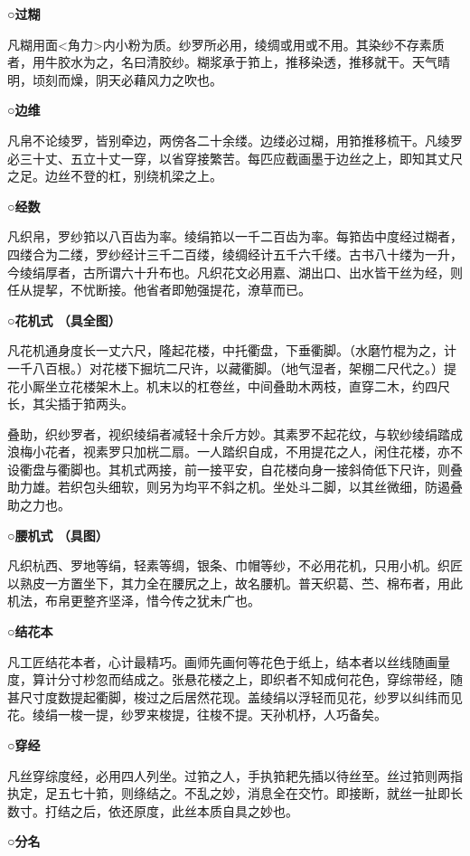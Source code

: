 \documentclass[]{article}
\begin{document}
\textbf{○过糊}

凡糊用面\textless{}角力\textgreater{}内小粉为质。纱罗所必用，绫绸或用或不用。其染纱不存素质者，用牛胶水为之，名曰清胶纱。糊浆承于筘上，推移染透，推移就干。天气晴明，顷刻而燥，阴天必藉风力之吹也。

\textbf{○边维}

凡帛不论绫罗，皆别牵边，两傍各二十余缕。边缕必过糊，用筘推移梳干。凡绫罗必三十丈、五立十丈一穿，以省穿接繁苦。每匹应截画墨于边丝之上，即知其丈尺之足。边丝不登的杠，别绕机梁之上。

\textbf{○经数}

凡织帛，罗纱筘以八百齿为率。绫绢筘以一千二百齿为率。每筘齿中度经过糊者，四缕合为二缕，罗纱经计三千二百缕，绫绸经计五千六千缕。古书八十缕为一升，今绫绢厚者，古所谓六十升布也。凡织花文必用嘉、湖出口、出水皆干丝为经，则任从提挈，不忧断接。他省者即勉强提花，潦草而已。

\textbf{○花机式 （具全图）}

凡花机通身度长一丈六尺，隆起花楼，中托衢盘，下垂衢脚。（水磨竹棍为之，计一千八百根。）对花楼下掘坑二尺许，以藏衢脚。（地气湿者，架棚二尺代之。）提花小厮坐立花楼架木上。机末以的杠卷丝，中间叠助木两枝，直穿二木，约四尺长，其尖插于筘两头。

叠助，织纱罗者，视织绫绢者减轻十余斤方妙。其素罗不起花纹，与软纱绫绢踏成浪梅小花者，视素罗只加桄二扇。一人踏织自成，不用提花之人，闲住花楼，亦不设衢盘与衢脚也。其机式两接，前一接平安，自花楼向身一接斜倚低下尺许，则叠助力雄。若织包头细软，则另为均平不斜之机。坐处斗二脚，以其丝微细，防遏叠助之力也。

\textbf{○腰机式 （具图）}

凡织杭西、罗地等绢，轻素等绸，银条、巾帽等纱，不必用花机，只用小机。织匠以熟皮一方置坐下，其力全在腰尻之上，故名腰机。普天织葛、苎、棉布者，用此机法，布帛更整齐坚泽，惜今传之犹未广也。

\textbf{○结花本}

凡工匠结花本者，心计最精巧。画师先画何等花色于纸上，结本者以丝线随画量度，算计分寸杪忽而结成之。张悬花楼之上，即织者不知成何花色，穿综带经，随甚尺寸度数提起衢脚，梭过之后居然花现。盖绫绢以浮轻而见花，纱罗以纠纬而见花。绫绢一梭一提，纱罗来梭提，往梭不提。天孙机杼，人巧备矣。

\textbf{○穿经}

凡丝穿综度经，必用四人列坐。过筘之人，手执筘耙先插以待丝至。丝过筘则两指执定，足五七十筘，则绦结之。不乱之妙，消息全在交竹。即接断，就丝一扯即长数寸。打结之后，依还原度，此丝本质自具之妙也。

\textbf{○分名}
\end{document}
